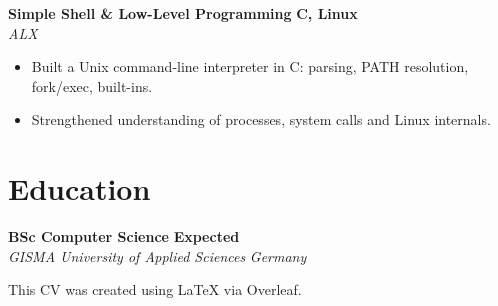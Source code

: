 \documentclass[11pt,a4paper]{article}
\newcommand{\entry}[4]{%
  \textbf{#1} \hfill \textbf{\color{grey}#2}\\
  \textit{\color{awsorange}#3} \hfill \textit{\color{grey}#4}\\[2pt]
}
\begin{document}
\entry{Simple Shell \& Low-Level Programming}{C, Linux}{ALX}{}
\vspace{-6pt}
\begin{itemize}[leftmargin=14pt, itemsep=1pt, topsep=2pt]
  \item Built a Unix command-line interpreter in C: parsing, PATH resolution, fork/exec, built-ins.
  \item Strengthened understanding of processes, system calls and Linux internals.
\end{itemize}

\section{Education}
\entry{BSc Computer Science}{Expected}{GISMA University of Applied Sciences}{Germany}

\vfill
\begin{center}
  \small\color{grey} This CV was created using \LaTeX{} via Overleaf.
\end{center}
\end{document}
